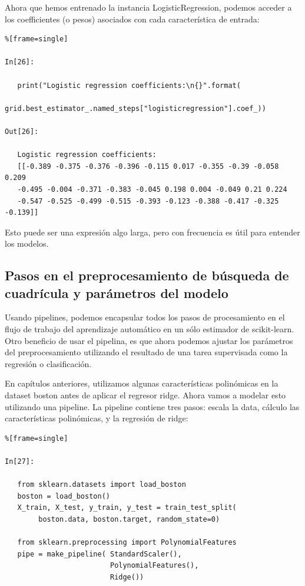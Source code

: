 	Ahora que hemos entrenado la instancia  {\ttfamily LogisticRegression}, podemos acceder a los coefficientes (o pesos) asociados con cada característica de entrada:	
	
	
	\begin{lstlisting}%[frame=single]
	
In[26]:
	
   print("Logistic regression coefficients:\n{}".format(
          grid.best_estimator_.named_steps["logisticregression"].coef_))
   
Out[26]:
   
   Logistic regression coefficients:
   [[-0.389 -0.375 -0.376 -0.396 -0.115 0.017 -0.355 -0.39 -0.058 0.209
   -0.495 -0.004 -0.371 -0.383 -0.045 0.198 0.004 -0.049 0.21 0.224
   -0.547 -0.525 -0.499 -0.515 -0.393 -0.123 -0.388 -0.417 -0.325 -0.139]]   
   \end{lstlisting}
   
   Esto puede ser una expresión algo larga, pero con frecuencia es útil  para entender los modelos.
   
   \subsection{Pasos en el preprocesamiento de búsqueda de cuadrícula y parámetros del modelo} 
	
	Usando pipelines, podemos encapsular todos los pasos de procesamiento en el flujo de trabajo del aprendizaje automático en un sólo estimador de {\ttfamily  scikit-learn}.  	Otro beneficio de usar el pipelina, es que ahora podemos ajustar los parámetros del 
	preprocesamiento utilizando  el resultado de una tarea supervisada como la regresión
	o clasificación.
	
	En capítulos anteriores, utilizamos  algunas  características polinómicas en la dataset  boston antes de aplicar el regresor ridge. Ahora vamos a modelar esto  utilizando una pipeline. La pipeline contiene tres pasos:  escala la data,  cálculo las características polinómicas, y la regresión de ridge:
	
	
	
	\begin{lstlisting}%[frame=single]
	
In[27]:
	
   from sklearn.datasets import load_boston
   boston = load_boston()
   X_train, X_test, y_train, y_test = train_test_split(
        boston.data, boston.target, random_state=0)
   
   from sklearn.preprocessing import PolynomialFeatures
   pipe = make_pipeline( StandardScaler(),
                         PolynomialFeatures(),
                         Ridge())
   
   \end{lstlisting}
   
